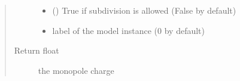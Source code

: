 \documentclass[letterpaper,10pt,english]{sphinxmanual}
\begin{document}
\begin{fulllineitems}
\begin{quote}
\begin{description}
\begin{itemize}
\item {} 
\sphinxAtStartPar
{} () \textendash{} True if subdivision is allowed (False by default)

\item {} 
\sphinxAtStartPar
{} \textendash{} label of the model instance (0 by default)

\end{itemize}

\item[{Return float}] \leavevmode
\sphinxAtStartPar
the monopole charge

\end{description}\end{quote}

\end{fulllineitems}

\end{document}

